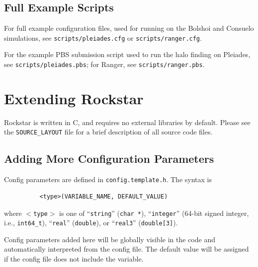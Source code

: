 \documentclass[12pt]{article}
\begin{document}
\subsection{Full Example Scripts}
\label{s:full_example_scripts}
      For full example configuration files, used for running on the Bolshoi
      and Consuelo simulations, see \texttt{scripts/pleiades.cfg} or \texttt{scripts/ranger.cfg}.

      For the example PBS submission script used to run the halo finding on
      Pleiades, see \texttt{scripts/pleiades.pbs}; for Ranger, see \texttt{scripts/ranger.pbs}.

\section{Extending Rockstar}

	Rockstar is written in C, and requires no external libraries by default.  Please see the \texttt{SOURCE\_LAYOUT} file for a brief description of all source code files.

\subsection{Adding More Configuration Parameters}
      Config parameters are defined in \texttt{config.template.h}.  The syntax is
\begin{verbatim}
          <type>(VARIABLE_NAME, DEFAULT_VALUE)
\end{verbatim}      
      where \texttt{$<$type$>$} is one of
      ``\texttt{string}'' (\texttt{char *}), ``\texttt{integer}'' (64-bit signed integer, i.e., \texttt{int64\_t}),
      ``\texttt{real}'' (\texttt{double}), or ``\texttt{real3}'' (\texttt{double[3]}).

      Config parameters added here will be globally visible in the code
      and automatically interpreted from the config file.  The default
      value will be assigned if the config file does not include the
      variable.
      
\end{document}
